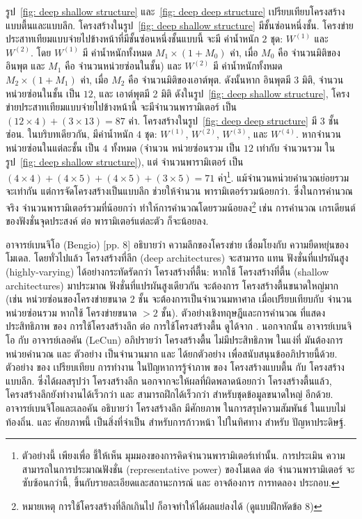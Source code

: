 รูป~\ref{fig: deep shallow structure} และ~\ref{fig: deep deep structure} เปรียบเทียบโครงสร้างแบบตื้นและแบบลึก.
โครงสร้างในรูป~\ref{fig: deep shallow structure} มีชั้นซ่อนหนึ่งชั้น. โครงข่ายประสาทเทียมแบบจ่ายไปข้างหน้าที่มีชั้นซ่อนหนึ่งชั้นแบบนี้ จะมี ค่าน้ำหนัก $2$ ชุด: $W^{(1)}$ และ $W^{(2)}$.
โดย $W^{(1)}$ มี ค่าน้ำหนักทั้งหมด $M_1 \times (1 + M_0)$ ค่า, เมื่อ $M_0$ คือ จำนวนมิติของอินพุต และ $M_1$ คือ จำนวนหน่วยซ่อนในชั้น)
และ $W^{(2)}$ มี ค่าน้ำหนักทั้งหมด $M_2 \times (1 + M_1)$ ค่า, เมื่อ $M_2$ คือ จำนวนมิติของเอาต์พุต.
ดังนั้นหาก อินพุตมี $3$ มิติ, จำนวนหน่วยซ่อนในชั้น เป็น $12$, และ เอาต์พุตมี 2 มิติ ดังในรูป~\ref{fig: deep shallow structure}, 
โครงข่ายประสาทเทียมแบบจ่ายไปข้างหน้านี้ จะมีจำนวนพารามิเตอร์ เป็น $(12 \times 4) + (3 \times 13) = 87$ ค่า.
โครงสร้างในรูป~\ref{fig: deep deep structure} มี $3$ ชั้นซ่อน.
ในบริบทเดียวกัน, มีค่าน้ำหนัก $4$ ชุด: $W^{(1)}$, $W^{(2)}$, $W^{(3)}$, และ $W^{(4)}$.
หากจำนวนหน่วยซ่อนในแต่ละชั้น เป็น $4$ ทั้งหมด (จำนวน หน่วยซ่อนรวม เป็น $12$ เท่ากับ จำนวนรวม ในรูป~\ref{fig: deep shallow structure}), 
แต่ จำนวนพารามิเตอร์ เป็น $(4 \times 4) + (4 \times 5) + (4 \times 5) + (3 \times 5) = 71$ ค่า\footnote{
ตัวอย่างนี้ เพียงเพื่อ ชี้ให้เห็น มุมมองของการคิดจำนวนพารามิเตอร์เท่านั้น.
การประเมิน ความสามารถในการประมาณฟังชั่น (representative power) ของโมเดล ต่อ จำนวนพารามิเตอร์ จะซับซ้อนกว่านี้, ขึ้นกับรายละเอียดและสถานะการณ์ และ อาจต้องการ การทดลอง ประกอบ.
}.
แม้จำนวนหน่วยคำนวณย่อยรวมจะเท่ากัน แต่การจัดโครงสร้างเป็นแบบลึก ช่วยให้จำนวน พารามิเตอร์รวมน้อยกว่า.
ซึ่งในการคำนวณจริง จำนวนพารามิเตอร์รวมที่น้อยกว่า ทำให้การคำนวณโดยรวมน้อยลง\footnote{
หมายเหตุ การใช้โครงสร้างที่ลึกเกินไป ก็อาจทำให้ได้ผลแย่ลงได้ (ดูแบบฝึกหัดข้อ 8)
} เช่น การคำนวณ เกรเดียนต์ของฟังชั่นจุดประสงค์ ต่อ พารามิเตอร์แต่ละตัว ก็จะน้อยลง.

อาจารย์เบนจิโอ (Bengio) \cite{Bengio2009a}[pp. 8] อธิบายว่า ความลึกของโครงข่าย เชื่อมโยงกับ ความยืดหยุ่นของโมเดล.
%
โดยทั่วไปแล้ว โครงสร้างที่ลึก (deep architectures) จะสามารถ แทน ฟังชั่นที่แปรผันสูง (highly-varying) ได้อย่างกระทัดรัดกว่า โครงสร้างที่ตื้น:
หากใช้ โครงสร้างที่ตื้น (shallow architectures) มาประมาณ ฟังชั่นที่แปรผันสูงเดียวกัน จะต้องการ โครงสร้างตื้นขนาดใหญ่มาก (เช่น หน่วยซ่อนของโครงข่ายขนาด $2$ ชั้น จะต้องการเป็นจำนวนมหาศาล เมื่อเปรียบเทียบกับ จำนวนหน่วยซ่อนรวม หากใช้ โครงข่ายขนาด $>2$ ชั้น).
ตัวอย่างเชิงทฤษฎีและการคำนวณ ที่แสดง ประสิทธิภาพ ของ การใช้โครงสร้างลึก ต่อ การใช้โครงสร้างตื้น ดูได้จาก \cite{Bengio2009a}.
นอกจากนั้น อาจารย์เบนจิโอ กับ อาจารย์เลอคัน (LeCun) \cite{BengioLeCun2007a} อภิปรายว่า 
โครงสร้างตื้น ไม่มีประสิทธิภาพ ในแง่ที่ มันต้องการ หน่วยคำนวณ และ ตัวอย่าง เป็นจำนวนมาก
และ ได้ยกตัวอย่าง เพื่อสนับสนุนข้ออภิปรายนี้ด้วย. 
ตัวอย่าง ของ \cite{BengioLeCun2007a} เปรียบเทียบ การทำงาน ในปัญหาการรู้จำภาพ ของ โครงสร้างแบบตื้น กับ โครงสร้างแบบลึก.
ซึ่งได้ผลสรุปว่า โครงสร้างลึก นอกจากจะให้ผลที่ผิดพลาดน้อยกว่า โครงสร้างตื้นแล้ว,
โครงสร้างลึกยังทำงานได้เร็วกว่า และ สามารถฝึกได้เร็วกว่า สำหรับชุดข้อมูลขนาดใหญ่ อีกด้วย.
อาจารย์เบนจิโอและเลอคัน อธิบายว่า โครงสร้างลึก มีศักยภาพ ในการสรุปความสัมพันธ์ ในแบบไม่ท้องถิ่น.
และ ศักยภาพนี้ เป็นสิ่งที่จำเป็น สำหรับการก้าวหน้า ไปในทิศทาง สำหรับ ปัญหาประดิษฐ์.

